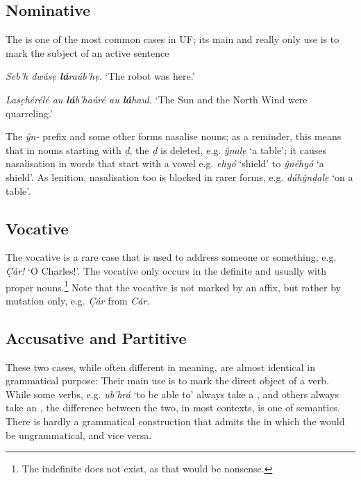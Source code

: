 \documentclass[a4paper, 12pt, twoside, openright, final]{book}
\def \b {ḅ}
\let \w \textit
\let \b \textbf
\begin{document}
\subsection{Nominative}
The  is one of the most common cases in UF; its main and really only use is to mark the subject of an active sentence
\begin{examples}
    \item \w{Seb’h dwásẹ \b{lá}raúb’hẹ.} ‘The robot was here.’
    \item \w{Lasẹhérélé au \b{lá}b’haúré au \b{lá}haul.} ‘The Sun and the North Wind were quarreling.’
\end{examples}

The  \w{ŷn-} prefix and some other forms nasalise nouns; as a reminder, this means that in
nouns starting with \w{ḍ}, the \w{ḍ} is deleted, e.g. \w{ŷnalẹ} ‘a table’; it causes nasalisation in words
that start with a vowel e.g. \w{ehyó} ‘shield’ to \w{ŷnéhyó} ‘a shield’. As lenition, nasalisation too is
blocked in rarer forms, e.g.  \w{dáhŷnḍalẹ} ‘on a table’.

\subsection{Vocative}
The vocative is a rare case that is used to address someone or something, e.g. \w{C̣ár!} ‘O Charles!’. The vocative
only occurs in the definite and usually with proper nouns.\footnote{The indefinite 
does not exist, as that would be nonsense.} Note that the vocative is not marked by an affix, but
rather by mutation only, e.g. \w{C̣ár} from \w{Cár}.

\subsection{Accusative and Partitive}
These two cases, while often different in meaning, are almost identical in grammatical purpose: Their main use is to
mark the direct object of a verb. While some verbs, e.g. \w{ub’hrá} ‘to be able to’ always take a , and others
always take an , the difference between the two, in most contexts, is one of semantics. There is hardly a grammatical
construction that admits the  in which the  would be ungrammatical, and vice versa.
\end{document}
